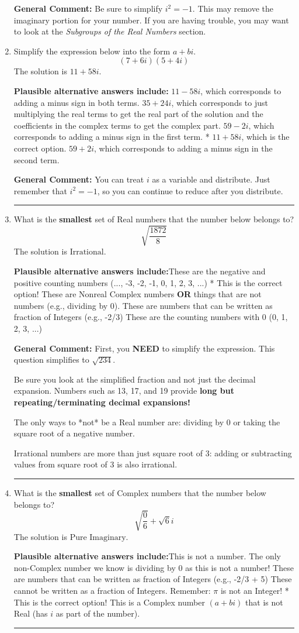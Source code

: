 \documentclass{extbook}[14pt]
\newcommand{\litem}[1]{\item #1

\rule{\textwidth}{0.4pt}}
\begin{document}
\begin{enumerate}
{\textbf{General Comment:} Be sure to simplify $i^2 = -1$. This may remove the imaginary portion for your number. If you are having trouble, you may want to look at the \textit{Subgroups of the Real Numbers} section.
}
\litem{
Simplify the expression below into the form $a+bi$.
\[ (7 + 6 i)(5 + 4 i) \]The solution is \( 11 + 58 i \).\begin{enumerate}[label=\Alph*.]
\textbf{Plausible alternative answers include:} $11 - 58 i$, which corresponds to adding a minus sign in both terms.
 $35 + 24 i$, which corresponds to just multiplying the real terms to get the real part of the solution and the coefficients in the complex terms to get the complex part.
 $59 - 2 i$, which corresponds to adding a minus sign in the first term.
* $11 + 58 i$, which is the correct option.
 $59 + 2 i$, which corresponds to adding a minus sign in the second term.
\end{enumerate}

\textbf{General Comment:} You can treat $i$ as a variable and distribute. Just remember that $i^2=-1$, so you can continue to reduce after you distribute.
}
\litem{
What is the \textbf{smallest} set of Real numbers that the number below belongs to?
\[ \sqrt{\frac{1872}{8}} \]The solution is \( \text{Irrational} \).\begin{enumerate}[label=\Alph*.]
\textbf{Plausible alternative answers include:}These are the negative and positive counting numbers (..., -3, -2, -1, 0, 1, 2, 3, ...)
* This is the correct option!
These are Nonreal Complex numbers \textbf{OR} things that are not numbers (e.g., dividing by 0).
These are numbers that can be written as fraction of Integers (e.g., -2/3)
These are the counting numbers with 0 (0, 1, 2, 3, ...)
\end{enumerate}

\textbf{General Comment:} First, you \textbf{NEED} to simplify the expression. This question simplifies to $\sqrt{234}$. 
 
 Be sure you look at the simplified fraction and not just the decimal expansion. Numbers such as 13, 17, and 19 provide \textbf{long but repeating/terminating decimal expansions!} 
 
 The only ways to *not* be a Real number are: dividing by 0 or taking the square root of a negative number. 
 
 Irrational numbers are more than just square root of 3: adding or subtracting values from square root of 3 is also irrational.
}
\litem{
What is the \textbf{smallest} set of Complex numbers that the number below belongs to?
\[ \sqrt{\frac{0}{6}}+\sqrt{6}i \]The solution is \( \text{Pure Imaginary} \).\begin{enumerate}[label=\Alph*.]
\textbf{Plausible alternative answers include:}This is not a number. The only non-Complex number we know is dividing by 0 as this is not a number!
These are numbers that can be written as fraction of Integers (e.g., -2/3 + 5)
These cannot be written as a fraction of Integers. Remember: $\pi$ is not an Integer!
* This is the correct option!
This is a Complex number $(a+bi)$ that is not Real (has $i$ as part of the number).
\end{enumerate}

}
\end{enumerate}
\end{document}
